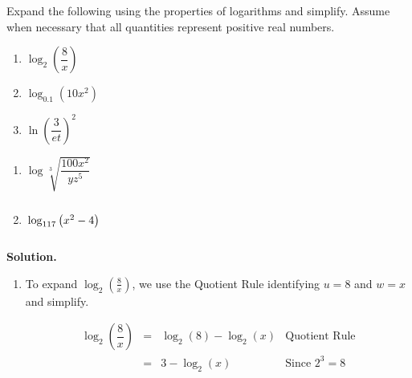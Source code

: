 \documentclass{ximera}
\begin{document}
\begin{ex}  \label{expandlogex} Expand the following using the properties of logarithms and simplify.  Assume when necessary that all quantities represent positive real numbers.

\begin{multicols}{3}
\begin{enumerate}

\item $\log_{2}\left(\dfrac{8}{x}\right)$ 

\item $\log_{0.1} \left(10 x^2 \right)$ 

\item  $\ln \left(\dfrac{3}{et}\right)^2$

\setcounter{HW}{\value{enumi}}
\end{enumerate}
\end{multicols}

\begin{multicols}{3}
\begin{enumerate}
\setcounter{enumi}{\value{HW}}

\item  $\log \sqrt[3]{\dfrac{100 x^2}{yz^5}}$

\item \label{factorlogpropex} $\vphantom{\log \sqrt[3]{\dfrac{100 x^2}{yz^5}}} \log_{117}\left(x^2 - 4\right)$

\setcounter{HW}{\value{enumi}}
\end{enumerate}
\end{multicols}

\newpage

{\bf Solution.}

\begin{enumerate}


\item  To expand $\log_{2}\left(\frac{8}{x}\right)$, we use the Quotient Rule identifying $u = 8$ and $w=x$ and simplify.

\setlength{\extrarowheight}{6pt}
\[ \begin{array}{rclr}

\log_{2}\left(\dfrac{8}{x}\right) & = &  \log_{2}(8) - \log_{2}(x) & \mbox{Quotient Rule} \\

& = &  3 - \log_{2}(x) & \mbox{Since $2^{3} = 8$} \\


\end{array}\]
\end{enumerate}
\end{ex}
\end{document}
